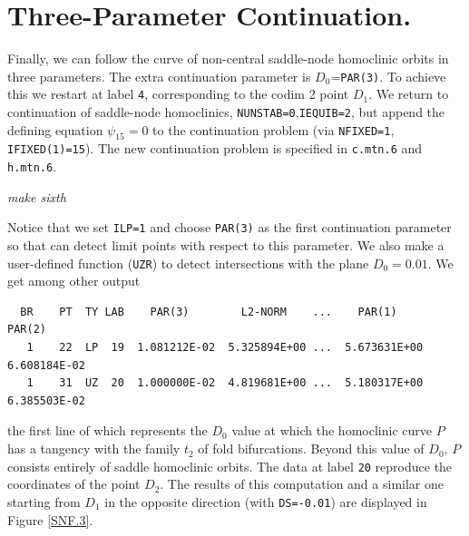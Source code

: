 \documentclass[12pt]{report}
\begin{document}
\section{Three-Parameter Continuation.}
Finally, we can follow the curve of non-central saddle-node homoclinic
orbits in three parameters. The extra continuation parameter is
$D_0$={\tt PAR(3)}.  To achieve this we restart at label {\tt 4},
corresponding to the codim 2 point $D_1$. We return to continuation of
saddle-node homoclinics, {\tt NUNSTAB=0},{\tt IEQUIB=2}, but append the
defining equation $\psi_{15}=0$ to the continuation problem
(via {\tt NFIXED=1}, {\tt IFIXED(1)=15}). The new
continuation problem is specified in {\tt c.mtn.6} and {\tt h.mtn.6}.
\begin{center}
{\it make sixth}
\end{center}
Notice that we set {\tt ILP=1} and choose {\tt PAR(3)} as the first 
continuation parameter so that \AUTO can detect limit points 
with respect to this parameter. We also make a user-defined function
({\tt UZR})
to detect intersections with the plane $D_0=0.01$.
We get among other output
\begin{verbatim}
  BR    PT  TY LAB    PAR(3)        L2-NORM    ...    PAR(1)        PAR(2)
   1    22  LP  19  1.081212E-02  5.325894E+00 ...  5.673631E+00  6.608184E-02
   1    31  UZ  20  1.000000E-02  4.819681E+00 ...  5.180317E+00  6.385503E-02
\end{verbatim}
the first line of which represents the $D_0$ value at which 
the homoclinic curve $P$ has a tangency with the family $t_2$ 
of fold bifurcations. Beyond this value of $D_0$,
$P$ consists entirely of saddle homoclinic orbits. The data at label {\tt 20} 
reproduce the coordinates of the point $D_2$. The results of this
computation and a similar one starting from $D_1$ in the opposite direction
(with {\tt DS=-0.01}) are displayed in Figure \ref{SNF.3}.
%

\newpage
\end{document}
